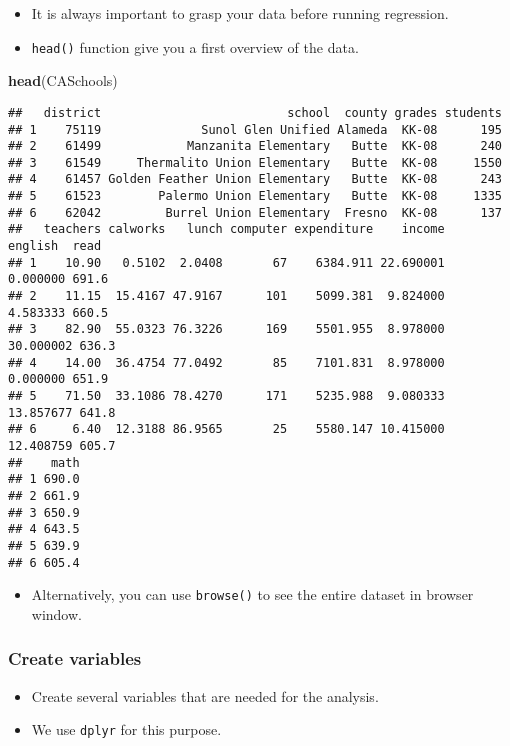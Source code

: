 \documentclass[]{book}
\newenvironment{Shaded}{\begin{snugshade}}{\end{snugshade}}
\newcommand{\KeywordTok}[1]{\textcolor[rgb]{0.13,0.29,0.53}{\textbf{#1}}}
\newcommand{\NormalTok}[1]{#1}
\providecommand{\tightlist}{%
  \setlength{\itemsep}{0pt}\setlength{\parskip}{0pt}}
\begin{document}
\begin{itemize}
\tightlist
\item
  It is always important to grasp your data before running regression.
\item
  \texttt{head()} function give you a first overview of the data.
\end{itemize}

\begin{Shaded}
\begin{Highlighting}[]
\KeywordTok{head}\NormalTok{(CASchools)}
\end{Highlighting}
\end{Shaded}

\begin{verbatim}
##   district                          school  county grades students
## 1    75119              Sunol Glen Unified Alameda  KK-08      195
## 2    61499            Manzanita Elementary   Butte  KK-08      240
## 3    61549     Thermalito Union Elementary   Butte  KK-08     1550
## 4    61457 Golden Feather Union Elementary   Butte  KK-08      243
## 5    61523        Palermo Union Elementary   Butte  KK-08     1335
## 6    62042         Burrel Union Elementary  Fresno  KK-08      137
##   teachers calworks   lunch computer expenditure    income   english  read
## 1    10.90   0.5102  2.0408       67    6384.911 22.690001  0.000000 691.6
## 2    11.15  15.4167 47.9167      101    5099.381  9.824000  4.583333 660.5
## 3    82.90  55.0323 76.3226      169    5501.955  8.978000 30.000002 636.3
## 4    14.00  36.4754 77.0492       85    7101.831  8.978000  0.000000 651.9
## 5    71.50  33.1086 78.4270      171    5235.988  9.080333 13.857677 641.8
## 6     6.40  12.3188 86.9565       25    5580.147 10.415000 12.408759 605.7
##    math
## 1 690.0
## 2 661.9
## 3 650.9
## 4 643.5
## 5 639.9
## 6 605.4
\end{verbatim}

\begin{itemize}
\tightlist
\item
  Alternatively, you can use \texttt{browse()} to see the entire dataset
  in browser window.
\end{itemize}

\subsubsection{Create variables}\label{create-variables}

\begin{itemize}
\tightlist
\item
  Create several variables that are needed for the analysis.
\item
  We use \texttt{dplyr} for this purpose.
\end{itemize}
\end{document}
